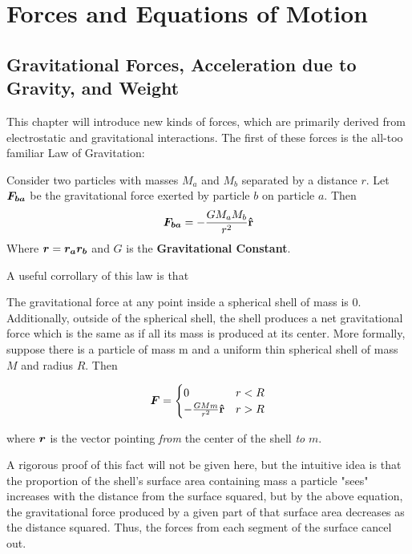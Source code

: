 \documentclass[openany,oneside]{book}
\begin{document}
\chapter{Forces and Equations of Motion}

\section{Gravitational Forces, Acceleration due to Gravity, and Weight}

This chapter will introduce new kinds of forces, which are primarily derived from electrostatic and gravitational interactions. 
The first of these forces is the all-too familiar Law of Gravitation: 

\begin{fact}
    Consider two particles with masses $M_a$ and $M_b$ separated by a distance $r$. Let $\bm{F_{ba}}$ be the gravitational force exerted by particle
    $b$ on particle $a$. Then 
    \[
        \bm{F_{ba}} = -\frac{G M_a M_b}{r^2}\boldsymbol{\hat{\textbf{r}}}  
    \]
    Where $\bm{r} = \bm{r_a r_b}$ and $G$ is the \textbf{Gravitational Constant}. 
\end{fact}

A useful corrollary of this law is that

\begin{fact}
    The gravitational force at any point inside a spherical shell of mass is 0. Additionally, outside of the spherical shell, 
    the shell produces a net gravitational force which is the same as if all its mass is produced at its center. More formally, 
    suppose there is a particle of mass m and a uniform thin spherical shell of mass $M$ and radius $R$. Then 

    \[
        \vect{F} = \begin{cases}
            0 & r < R \\
            -\frac{G M m}{r^2}\rhat & r > R \\  
        \end{cases} 
    \]

    where $\bm{r}$ is the vector pointing \textit{from} the center of the shell \textit{to} $m$.
\end{fact}

A rigorous proof of this fact will not be given here, but the intuitive idea is that the proportion of the shell's surface area containing mass a particle
"sees" increases with the distance from the surface squared, but by the above equation, the gravitational force produced by a given part of that 
surface area decreases as the distance squared. Thus, the forces from each segment of the surface cancel out. 
\newpage











\end{document}
